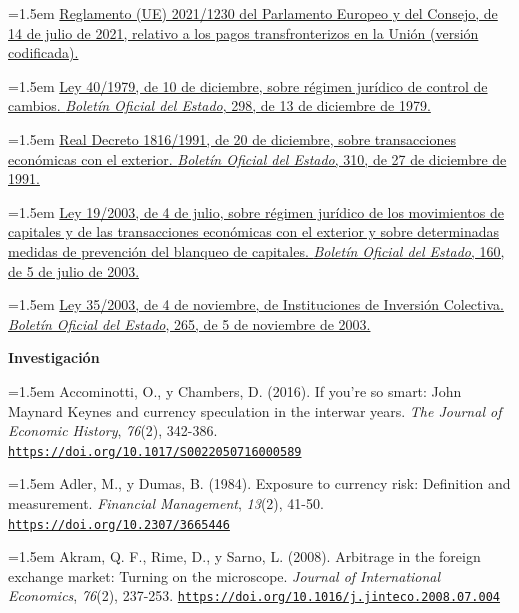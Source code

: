 \documentclass[10pt,a4paper]{article}
\begin{document}
\noindent\hangindent=1.5em \href{https://eur-lex.europa.eu/eli/reg/2021/1230/oj}{Reglamento (UE) 2021/1230 del Parlamento Europeo y del Consejo, de 14 de julio de 2021, relativo a los pagos transfronterizos en la Unión (versión codificada).}

\noindent\hangindent=1.5em \href{https://www.boe.es/buscar/doc.php?id=BOE-A-1979-29281}{Ley 40/1979, de 10 de diciembre, sobre régimen jurídico de control de cambios. \textit{Boletín Oficial del Estado}, 298, de 13 de diciembre de 1979.}

\noindent\hangindent=1.5em \href{https://www.boe.es/eli/es/rd/1991/12/20/1816}{Real Decreto 1816/1991, de 20 de diciembre, sobre transacciones económicas con el exterior. \textit{Boletín Oficial del Estado}, 310, de 27 de diciembre de 1991.}

\noindent\hangindent=1.5em \href{https://www.boe.es/eli/es/l/2003/07/04/19}{Ley 19/2003, de 4 de julio, sobre régimen jurídico de los movimientos de capitales y de las transacciones económicas con el exterior y sobre determinadas medidas de prevención del blanqueo de capitales. \textit{Boletín Oficial del Estado}, 160, de 5 de julio de 2003.}

\noindent\hangindent=1.5em \href{https://www.boe.es/buscar/act.php?id=BOE-A-2003-20331}{Ley 35/2003, de 4 de noviembre, de Instituciones de Inversión Colectiva. \textit{Boletín Oficial del Estado}, 265, de 5 de noviembre de 2003.}

\textbf{Investigación}

\noindent\hangindent=1.5em Accominotti, O., y Chambers, D. (2016). If you're so smart: John Maynard Keynes and currency speculation in the interwar years. \textit{The Journal of Economic History}, \textit{76}(2), 342-386. \href{https://doi.org/10.1017/S0022050716000589}{\nolinkurl{https://doi.org/10.1017/S0022050716000589}}

\noindent\hangindent=1.5em Adler, M., y Dumas, B. (1984). Exposure to currency risk: Definition and measurement. \textit{Financial Management}, \textit{13}(2), 41-50. \href{https://doi.org/10.2307/3665446}{\nolinkurl{https://doi.org/10.2307/3665446}}

\noindent\hangindent=1.5em Akram, Q. F., Rime, D., y Sarno, L. (2008). Arbitrage in the foreign exchange market: Turning on the microscope. \textit{Journal of International Economics}, \textit{76}(2), 237-253. \href{https://doi.org/10.1016/j.jinteco.2008.07.004}{\nolinkurl{https://doi.org/10.1016/j.jinteco.2008.07.004}}
\end{document}
